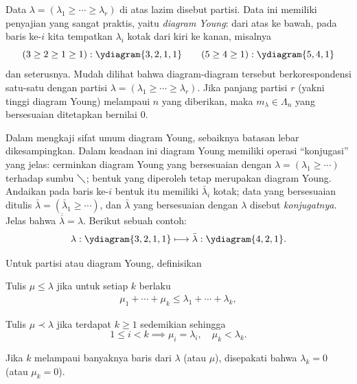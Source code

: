 Data $\lambda = (\lambda_1 \geq \cdots \geq \lambda_r)$ di atas lazim disebut partisi. Data ini memiliki penyajian yang sangat praktis, yaitu \emph{diagram Young}: dari atas ke bawah, pada baris ke-$i$ kita tempatkan $\lambda_i$ kotak dari kiri ke kanan, misalnya  
\begin{equation*}
	(3 \geq 2 \geq 1 \geq 1): \ydiagram{3,2,1,1} \qquad (5 \geq 4 \geq 1): \ydiagram{5,4,1}
\end{equation*}
dan seterusnya. Mudah dilihat bahwa diagram-diagram tersebut berkorespondensi satu-satu dengan partisi $\lambda = (\lambda_1 \geq \cdots \geq \lambda_r)$. Jika panjang partisi $r$ (yakni tinggi diagram Young) melampaui $n$ yang diberikan, maka $m_\lambda \in \Lambda_n$ yang bersesuaian ditetapkan bernilai $0$.

Dalam mengkaji sifat umum diagram Young, sebaiknya batasan lebar dikesampingkan. Dalam keadaan ini diagram Young memiliki operasi ``konjugasi'' yang jelas: cerminkan diagram Young yang bersesuaian dengan $\lambda = (\lambda_1 \geq \cdots)$ terhadap sumbu $\diagdown$; bentuk yang diperoleh tetap merupakan diagram Young. Andaikan pada baris ke-$i$ bentuk itu memiliki $\bar{\lambda}_i$ kotak; data yang bersesuaian ditulis $\bar{\lambda} = (\bar{\lambda}_1 \geq \cdots)$, dan $\bar{\lambda}$ yang bersesuaian dengan $\lambda$ disebut \emph{konjugatnya}. Jelas bahwa $\overline{\overline{\lambda}} = \lambda$. Berikut sebuah contoh:
\[ \lambda: \ydiagram{3,2,1,1} \longmapsto \bar{\lambda}: \ydiagram{4,2,1}. \]

\begin{definition}
	Untuk partisi atau diagram Young, definisikan
	\begin{compactdesc}
		\item[Urutan dominasi] Tulis $\mu \leq \lambda$ jika untuk setiap $k$ berlaku
			\begin{gather}\label{eqn:dominance-order}
				\mu_1 + \cdots + \mu_k \leq \lambda_1 + \cdots + \lambda_k,
			\end{gather}
		\item[Urutan leksikografis] Tulis $\mu \prec \lambda$ jika terdapat $k \geq 1$ sedemikian sehingga
			\[1 \leq i < k \implies \mu_i = \lambda_i, \quad \mu_k < \lambda_k. \]
	\end{compactdesc}
	Jika $k$ melampaui banyaknya baris dari $\lambda$ (atau $\mu$), disepakati bahwa $\lambda_k=0$ (atau $\mu_k=0$).
\end{definition}

